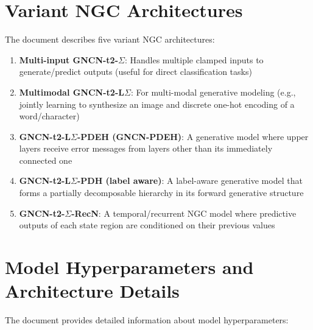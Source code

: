 \documentclass{article}
\begin{document}
\section{Variant NGC Architectures}

The document describes five variant NGC architectures:

\begin{enumerate}
  \item \textbf{Multi-input GNCN-t2-$\Sigma$}: Handles multiple clamped inputs to generate/predict outputs (useful for direct classification tasks)

  \item \textbf{Multimodal GNCN-t2-L$\Sigma$}: For multi-modal generative modeling (e.g., jointly learning to synthesize an image and discrete one-hot encoding of a word/character)

  \item \textbf{GNCN-t2-L$\Sigma$-PDEH (GNCN-PDEH)}: A generative model where upper layers receive error messages from layers other than its immediately connected one

  \item \textbf{GNCN-t2-L$\Sigma$-PDH (label aware)}: A label-aware generative model that forms a partially decomposable hierarchy in its forward generative structure

  \item \textbf{GNCN-t2-$\Sigma$-RecN}: A temporal/recurrent NGC model where predictive outputs of each state region are conditioned on their previous values
\end{enumerate}

\section{Model Hyperparameters and Architecture Details}

The document provides detailed information about model hyperparameters:
\end{document}
